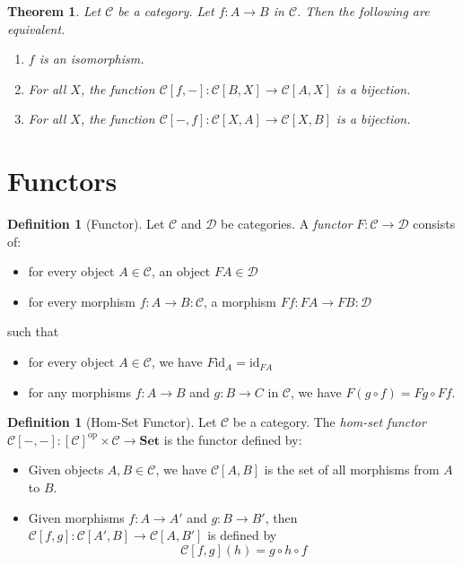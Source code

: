 \documentclass{book}
\newtheorem{theorem}[lemma]{Theorem}
\theoremstyle{definition}
\newtheorem{definition}[lemma]{Definition}
\newcommand{\CC}{\ensuremath{\mathcal{C}}}
\newcommand{\DD}{\ensuremath{\mathcal{D}}}
\newcommand{\id}[1]{\ensuremath{\mathrm{id}_{#1}}}
\newcommand{\op}[1]{\ensuremath{[#1]^{\mathrm{op}}}}
\newcommand{\Set}{\ensuremath{\mathbf{Set}}}
\begin{document}
\begin{theorem}
    Let $\CC$ be a category. Let $f : A \rightarrow B$ in $\CC$. Then the following are equivalent.
    \begin{enumerate}
        \item $f$ is an isomorphism.
        \item For all $X$, the function $\CC[f,-] : \CC[B,X] \rightarrow \CC[A,X]$ is a bijection.
        \item For all $X$, the function $\CC[-,f] : \CC[X,A] \rightarrow \CC[X,B]$ is a bijection.
    \end{enumerate}
\end{theorem}

\section{Functors}

\begin{definition}[Functor]
    Let $\CC$ and $\DD$ be categories. A \emph{functor} $F : \CC \rightarrow \DD$ consists of:
    \begin{itemize}
        \item for every object $A \in \CC$, an object $FA \in \DD$
        \item for every morphism $f : A \rightarrow B : \CC$, a morphism $Ff : FA \rightarrow FB : \DD$
    \end{itemize}
    such that
    \begin{itemize}
        \item for every object $A \in \CC$, we have $F \id{A} = \id{FA}$
        \item for any morphisms $f : A \rightarrow B$ and $g : B \rightarrow C$ in $\CC$, we have $F(g \circ f) = Fg \circ Ff$.
    \end{itemize}
\end{definition}

\begin{definition}[Hom-Set Functor]
    Let $\CC$ be a category. The \emph{hom-set functor} $\CC[-,-] : \op{\CC} \times \CC \rightarrow \Set$ is the functor defined by:
    \begin{itemize}
        \item Given objects $A, B \in \CC$, we have $\CC[A,B]$ is the set of all morphisms from $A$ to $B$.
        \item Given morphisms $f : A \rightarrow A'$ and $g : B \rightarrow B'$, then $\CC[f,g] : \CC[A',B] \rightarrow \CC[A,B']$
        is defined by
        \[ \CC[f,g](h) = g \circ h \circ f \]
    \end{itemize}
\end{definition}
\end{document}
